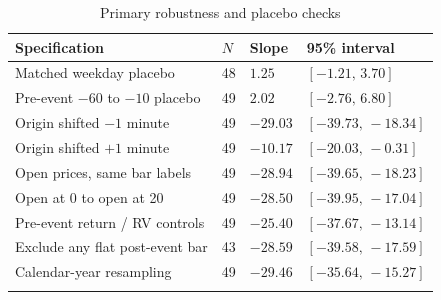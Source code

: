\begin{table}[htbp]
\centering
{\fontsize{10}{12}\selectfont\renewcommand{\arraystretch}{1.22}\setlength{\tabcolsep}{4pt}
\begin{tabularx}{\linewidth}{@{}L{73mm}C{12mm}C{25mm}X@{}}
\toprule{}
\textbf{Specification} & \textbf{$N$} & \textbf{Slope} & \textbf{95\% interval} \\ \midrule
Matched weekday placebo & 48 & $1.25$ & $[-1.21,\,3.70]$ \\ \hline
Pre-event $-60$ to $-10$ placebo & 49 & $2.02$ & $[-2.76,\,6.80]$ \\ \hline
Origin shifted $-1$ minute & 49 & $-29.03$ & $[-39.73,\,-18.34]$ \\ \hline
Origin shifted $+1$ minute & 49 & $-10.17$ & $[-20.03,\,-0.31]$ \\ \hline
Open prices, same bar labels & 49 & $-28.94$ & $[-39.65,\,-18.23]$ \\ \hline
Open at 0 to open at 20 & 49 & $-28.50$ & $[-39.95,\,-17.04]$ \\ \hline
Pre-event return / RV controls & 49 & $-25.40$ & $[-37.67,\,-13.14]$ \\ \hline
Exclude any flat post-event bar & 43 & $-28.59$ & $[-39.58,\,-17.59]$ \\ \hline
Calendar-year resampling & 49 & $-29.46$ & $[-35.64,\,-15.27]$ \\ \hline
{}\bottomrule\end{tabularx}}
\caption[Primary robustness and placebo checks]{Primary robustness and placebo checks}\label{tab:robustness}
\end{table}
